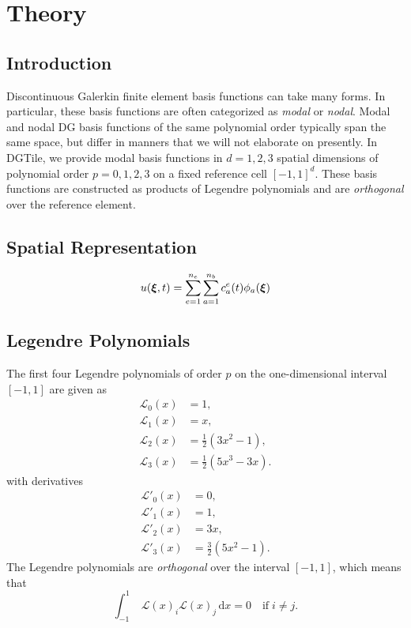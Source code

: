 \section{Theory}

\subsection{Introduction}

Discontinuous Galerkin finite element basis functions can take many forms.
In particular, these basis functions are often categorized as \emph{modal}
or \emph{nodal}. Modal and nodal DG basis functions of the same polynomial
order typically span the same space, but differ in manners that we will not
elaborate on presently. In DGTile, we provide modal basis functions in
$d=1,2,3$ spatial dimensions of polynomial order $p=0,1,2,3$ on a fixed
reference cell $[-1,1]^d$. These basis functions are constructed as products
of Legendre polynomials and are \emph{orthogonal} over the reference element.

\subsection{Spatial Representation}

\begin{equation}
u(\boldsymbol{\xi}, t) = \sum_{e=1}^{n_e} \sum_{a=1}^{n_b} c_a^e(t) \phi_a(\boldsymbol{\xi})
\end{equation}

\subsection{Legendre Polynomials}

The first four Legendre polynomials of order $p$ on the one-dimensional
interval $[-1,1]$ are given as
%
\begin{equation}
\begin{aligned}
\mathcal{L}_0(x) &= 1, \\
\mathcal{L}_1(x) &= x, \\
\mathcal{L}_2(x) &= \frac12 (3x^2-1), \\
\mathcal{L}_3(x) &= \frac12 (5x^3-3x).
\end{aligned}
\label{eq:legendre_polynomials}
\end{equation}
%
with derivatives
%
\begin{equation}
\begin{aligned}
\mathcal{L}'_0(x) &= 0, \\
\mathcal{L}'_1(x) &= 1, \\
\mathcal{L}'_2(x) &= 3x, \\
\mathcal{L}'_3(x) &= \frac32(5x^2-1).
\end{aligned}
\label{eq:legendre_polynomial_derivatives}
\end{equation}
%
The Legendre polynomials are \emph{orthogonal} over the interval $[-1,1]$,
which means that
%
\begin{equation}
\int_{-1}^1 \; \mathcal{L}(x)_i \mathcal{L}(x)_j \, \text{d}x = 0
\quad \text{if} \; i \neq j.
\end{equation}

